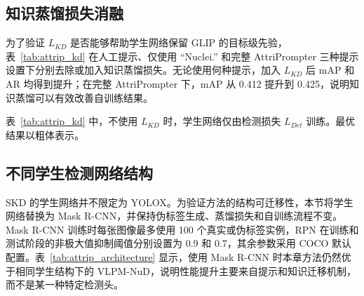 \subsection{知识蒸馏损失消融}

为了验证 $L_{KD}$ 是否能够帮助学生网络保留 GLIP 的目标级先验，表~\ref{tab:attrip_kd} 在人工提示、仅使用 ``Nuclei.'' 和完整 AttriPrompter 三种提示设置下分别去除或加入知识蒸馏损失。无论使用何种提示，加入 $L_{KD}$ 后 mAP 和 AR 均得到提升；在完整 AttriPrompter 下，mAP 从 0.412 提升到 0.425，说明知识蒸馏可以有效改善自训练结果。

\begin{table}[t]
\caption{知识蒸馏损失消融}
\label{tab:attrip_kd}
\begin{center}
\end{center}
\end{table}
表~\ref{tab:attrip_kd} 中，不使用 $L_{KD}$ 时，学生网络仅由检测损失 $L_{Det}$ 训练。最优结果以粗体表示。


\subsection{不同学生检测网络结构}

SKD 的学生网络并不限定为 YOLOX。为验证方法的结构可迁移性，本节将学生网络替换为 Mask R-CNN，并保持伪标签生成、蒸馏损失和自训练流程不变。Mask R-CNN 训练时每张图像最多使用 100 个真实或伪标签实例，RPN 在训练和测试阶段的非极大值抑制阈值分别设置为 0.9 和 0.7，其余参数采用 COCO 默认配置。表~\ref{tab:attrip_architecture} 显示，使用 Mask R-CNN 时本章方法仍然优于相同学生结构下的 VLPM-NuD，说明性能提升主要来自提示和知识迁移机制，而不是某一种特定检测头。

